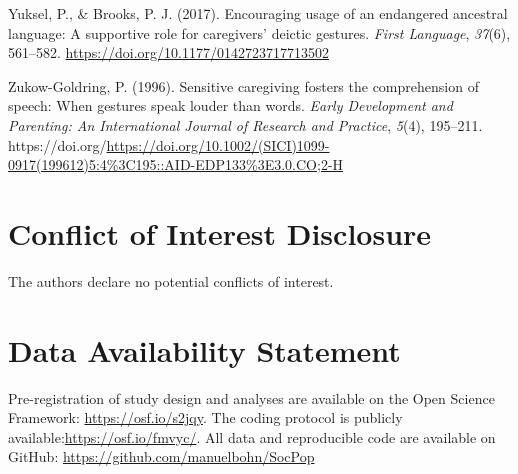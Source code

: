 \documentclass[
  man,floatsintext]{apa6}
\newlength{\cslhangindent}
\newlength{\cslentryspacingunit} %
\newenvironment{CSLReferences}[2] %
 {%
  \setlength{\parindent}{0pt}
  \ifodd #1
  \let\oldpar\par
  \def\par{\hangindent=\cslhangindent\oldpar}
  \fi
  \setlength{\parskip}{#2\cslentryspacingunit}
 }%
 {}
\begin{document}
\begin{CSLReferences}{1}{0}
\leavevmode{}%
Yuksel, P., \& Brooks, P. J. (2017). Encouraging usage of an endangered ancestral language: {A} supportive role for caregivers' deictic gestures. \emph{First Language}, \emph{37}(6), 561--582. \url{https://doi.org/10.1177/0142723717713502}

\leavevmode{}%
Zukow-Goldring, P. (1996). Sensitive caregiving fosters the comprehension of speech: {When} gestures speak louder than words. \emph{Early Development and Parenting: An International Journal of Research and Practice}, \emph{5}(4), 195--211. https://doi.org/\url{https://doi.org/10.1002/(SICI)1099-0917(199612)5:4\%3C195::AID-EDP133\%3E3.0.CO;2-H}

\end{CSLReferences}

\hypertarget{conflict-of-interest-disclosure}{%
\section{Conflict of Interest Disclosure}\label{conflict-of-interest-disclosure}}

The authors declare no potential conflicts of interest.

\hypertarget{data-availability-statement}{%
\section{Data Availability Statement}\label{data-availability-statement}}

Pre-registration of study design and analyses are available on the Open Science Framework: \url{https://osf.io/s2jqy}. The coding protocol is publicly available:\url{https://osf.io/fmvyc/}. All data and reproducible code are available on GitHub: \url{https://github.com/manuelbohn/SocPop}
\end{document}
